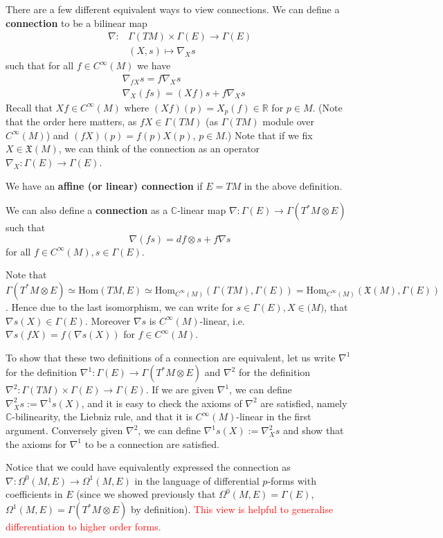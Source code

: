 \documentclass[a4paper]{article}
\theoremstyle{definition} \newtheorem*{definition}{Definition}
\theoremstyle{definition} \newtheorem*{definitions}{Definitions}
\theoremstyle{plain} \newtheorem{theorem}{Theorem}[section]
\theoremstyle{plain} \newtheorem{proposition}[theorem]{Proposition}
\theoremstyle{plain} \newtheorem{corollary}[theorem]{Corollary}
\theoremstyle{plain} \newtheorem{lemma}[theorem]{Lemma}
\theoremstyle{plain} \newtheorem{example}[theorem]{Example}
\newcommand{\checkCorrect}[1]{\textcolor{red}{#1}}
\newcommand{\defn}[1]{\textbf{#1}}
\newcommand{\realnos}{\mathbb{R}}
\newcommand{\complexnos}{\mathbb{C}}
\newcommand{\Hom}{\text{Hom}}
\newcommand{\smooth}{C^\infty}
\begin{document}
There are a few different equivalent ways to view connections.
We can define a \defn{connection} to be a bilinear map 
\begin{align*}
\nabla: & \Gamma(TM)\times \Gamma(E)\to \Gamma(E) \\
& (X, s)\mapsto \nabla_X s
\end{align*}
such that for all $f\in \smooth (M)$ we have
\begin{align*}
& \nabla_{fX}s=f\nabla_X s \\
& \nabla_X(fs)=(Xf)s + f\nabla_X s 
\end{align*}
Recall that $Xf\in \smooth(M)$ where $(Xf)(p)=X_p(f)\in \realnos$ for $p\in M$. (Note that the order here matters, as $fX\in \Gamma(TM)$ (as $\Gamma(TM)$ module over $\smooth(M)$) and $(fX)(p) = f(p)X(p)$, $p\in M$.) Note that if we fix 
$X\in \mathfrak{X}(M)$, we can think of the connection as an operator $\nabla_X:\Gamma(E)\to \Gamma(E)$.

We have an \defn{affine (or linear) connection} if $E=TM$ in the above definition.

We can also define a \defn{connection} as a $\complexnos$-linear map $\nabla : \Gamma(E)\to \Gamma(T^\ast M\otimes E)$ such that 
$$\nabla(fs)=df \otimes s + f\nabla s$$ 
for all $f\in C^\infty(M), s\in \Gamma(E)$.   

Note that $\Gamma(T^*M\otimes E)\simeq \Hom(TM, E)\simeq \Hom_{\smooth(M)}(\Gamma(TM), \Gamma(E)) = \Hom_{\smooth(M)}(\mathfrak{X}(M), \Gamma(E))$. Hence due to the last isomorphism, we can write for $s\in \Gamma(E), X\in \mathfrak(M)$, that $\nabla s(X)\in \Gamma(E)$. Moreover $\nabla s$ is $\smooth(M)$-linear, i.e. $\nabla s(fX)=f(\nabla s (X))$ for $f\in \smooth (M)$.

To show that these two definitions of a connection are equivalent, let us write $\nabla^1$ for the definition $\nabla^1:\Gamma(E)\to \Gamma(T^*M\otimes E)$ and $\nabla^2$ for the definition $\nabla^2:\Gamma(TM)\times \Gamma(E)\to \Gamma(E)$. If we are given $\nabla^1$, we can define $\nabla^2_X s:=\nabla^1 s(X)$, and it is easy to check the axioms of $\nabla^2$ are satisfied, namely $\complexnos$-bilinearity, the Liebniz rule, and that it is $\smooth(M)$-linear in the first argument. Conversely given $\nabla^2$, we can define $\nabla^1 s(X):=\nabla^2_X s$ and show that the axioms for $\nabla^1$ to be a connection are satisfied. 

Notice that we could have equivalently expressed the connection as $\nabla:\Omega^0(M, E)\to \Omega^1(M, E)$ in the language of differential $p$-forms with coefficients in $E$ (since we showed previously that $\Omega^0(M, E)=\Gamma(E)$, $\Omega^1(M, E)=\Gamma(T^*M\otimes E)$ by definition).  \checkCorrect{This view is helpful to generalise differentiation to higher order forms.}
\end{document}
